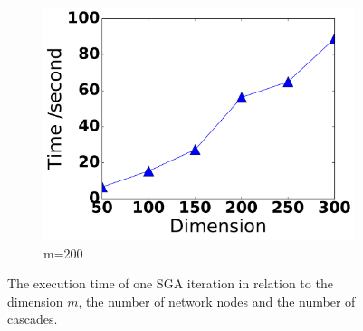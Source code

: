 \begin{figure}[t]
\begin{subfigure}{.45\textwidth}
\centering
\includegraphics[width=.99\linewidth]{img/chap3/dimension_time.pdf}
\caption{m=200}\label{fig:dimension_time}
\end{subfigure} 

\caption{The execution time of one SGA iteration in relation to the dimension $m$, the number of network nodes and the number of cascades.}
\end{figure}

